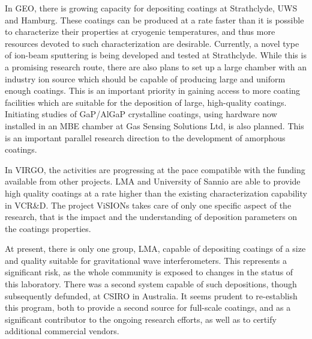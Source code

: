 In GEO, there is growing capacity for depositing coatings at Strathclyde, UWS and Hamburg. These coatings can be produced at a rate faster than it is possible to characterize their properties at cryogenic temperatures, and thus more resources devoted to such characterization are desirable. Currently, a novel type of ion-beam sputtering is being developed and tested at Strathclyde. While this is a promising research route, there are also plans to set up a large chamber with an industry ion source which should be capable of producing large and uniform enough coatings. This is an important priority in gaining access to more coating facilities which are suitable for the deposition of large, high-quality coatings. Initiating studies of GaP/AlGaP crystalline coatings, using hardware now installed in an MBE chamber at Gas Sensing Solutions Ltd, is also planned. This is an important parallel research direction to the development of amorphous coatings.

In VIRGO, the activities are progressing at the pace compatible with the funding available from other projects.  LMA and University of Sannio are able to provide high quality coatings at a rate higher than the existing characterization capability in VCR\&D. The project ViSIONs takes care of only one specific aspect of the research, that is the impact and the understanding of deposition parameters on the coatings properties.

At present, there is only one group, LMA, capable of depositing coatings of a size and quality suitable for gravitational wave interferometers. This represents a significant risk, as the whole community is exposed to changes in the status of this laboratory. There was a second system capable of such depositions, though subsequently defunded, at CSIRO in Australia. It seems prudent to re-establish this program, both to provide a second source for full-scale coatings, and as a significant contributor to the ongoing research efforts, as well as to certify additional commercial vendors. 


 \\


 


